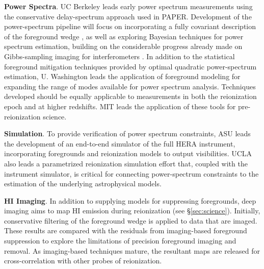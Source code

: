 \documentclass[ars]{/Users/daviddeboer1/Documents/Papers/Copernicus_LaTeX_Package_v_2_7/copernicus}
\begin{document}
{\bf Power Spectra}. UC Berkeley leads early power spectrum measurements using the conservative
delay-spectrum approach used in PAPER.  %
Development of
the power-spectrum pipeline will focus on incorporating
a fully covariant description of the foreground wedge
\citep{liu_tegmark2011,dillon_et_al2013a}, as well as
exploring Bayesian techniques for power spectrum estimation, building on the considerable
progress already made on Gibbs-sampling imaging for interferometers \citep{sutter_et_al2014}.
In addition to the statistical foreground mitigation techniques provided by optimal quadratic
power-spectrum estimation, U. Washington leads the application of 
foreground modeling for expanding the range of modes available for power spectrum analysis.
Techniques developed should be equally applicable
to measurements in both the reionization epoch and at higher redshifts.  MIT leads the application
of these tools for pre-reionization science.

{\bf Simulation}. To provide verification of power spectrum constraints, ASU leads the
development of an end-to-end simulator of the full HERA instrument, incorporating
foregrounds and reionization models to output visibilities.  UCLA also leads
a parametrized reionization simulation effort that, coupled with the instrument
simulator, is critical for connecting power-spectrum constraints to the estimation
of the underlying astrophysical models.


{\bf HI Imaging}. In addition to supplying models for suppressing foregrounds,
deep imaging aims to map HI emission during reionization (see \S\ref{sec:science}).
Initially, conservative filtering of the foreground wedge is applied to data that
are imaged.  These results are compared with the residuals from imaging-based
foreground suppression to explore the limitations of 
precision foreground imaging and removal.  As imaging-based techniques mature, the resultant
maps are released for cross-correlation with other probes of reionization.

%
\end{document}
